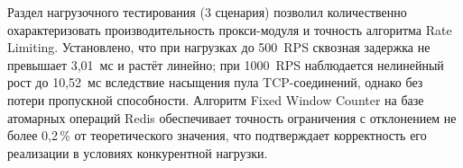 Раздел нагрузочного тестирования (3 сценария) позволил количественно охарактеризовать производительность прокси-модуля и точность алгоритма Rate Limiting. Установлено, что при нагрузках до 500~RPS сквозная задержка не превышает 3,01~мс и растёт линейно; при 1000~RPS наблюдается нелинейный рост до 10,52~мс вследствие насыщения пула TCP-соединений, однако без потери пропускной способности. Алгоритм Fixed Window Counter на базе атомарных операций Redis обеспечивает точность ограничения с отклонением не более 0,2\,\% от теоретического значения, что подтверждает корректность его реализации в условиях конкурентной нагрузки.